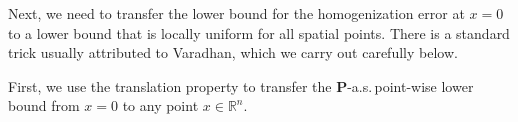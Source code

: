 \documentclass[11pt,reqno]{amsart}
\newtheorem{prop}[thm]{Proposition}
\theoremstyle{definition}
\theoremstyle{remark}
\numberwithin{equation}{section}
\newcommand{\eps}{\epsilon}
\newcommand{\R}{{\mathbb{R}}}
\begin{document}
Next, we need to transfer the lower bound for the homogenization error at $x=0$ to a lower bound that is locally uniform for all spatial points. There is a standard trick usually attributed to Varadhan, which we carry out carefully below. 
%
%
%

First, we use the translation property to transfer the $\mathbf{P}$-a.s.\,point-wise lower bound from $x=0$ to any point $x\in \R^n$.
\end{document}
